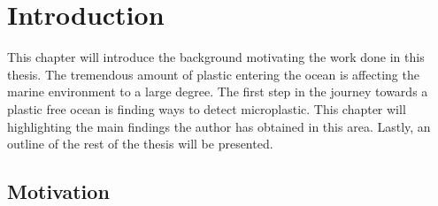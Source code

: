 \chapter{Introduction}
\label{chap:introduction}
This chapter will introduce the background motivating the work done in this thesis. The tremendous amount of plastic entering the ocean is affecting the marine environment to a large degree. The first step in the journey towards a plastic free ocean is finding ways to detect microplastic. This chapter will highlighting the main findings the author has obtained in this area. Lastly, an outline of the rest of the thesis will be presented.

\section{Motivation}



